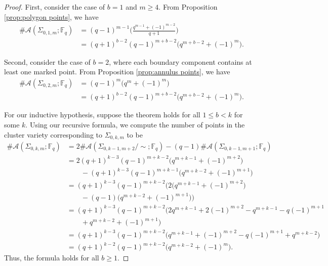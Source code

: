 \documentclass[reqno,12pt]{amsart}
\theoremstyle{definition}
\theoremstyle{remark}
\theoremstyle{remark}
\numberwithin{equation}{section}
\begin{document}
\begin{proof}
    First, consider the case of $b=1$ and $m\geq 4$. From Proposition \ref{prop:polygon points}, we have 
    \begin{align*}
     \#\mathcal{A}(\Sigma_{0,1,m}; \mathbb{F}_q) &= (q-1)^{m-1} \Bigg( \frac{q^{m-1} + (-1)^{m-2}}{q+1} \Bigg) \\
     &= (q+1)^{b-2} (q-1)^{m+b-2} \big( q^{m+b-2} + (-1)^{m}\big).
    \end{align*}
    
    Second, consider the case of $b=2$, where each boundary component contains at least one marked point. From Proposition \ref{prop:annulus points}, we have
    \begin{align*}
     \#\mathcal{A}(\Sigma_{0,2,m}; \mathbb{F}_q) &= (q-1)^{m} \big( q^{m} + (-1)^{m} \big) \\
     &= (q+1)^{b-2} (q-1)^{m+b-2} \big( q^{m+b-2} + (-1)^{m}\big).
    \end{align*}
    
    For our inductive hypothesis, suppose the theorem holds for all $1 \leq b<k$ for some $k$. Using our recursive formula, we compute the number of points in the cluster variety corresponding to $\Sigma_{0,k,m}$ to be 
    \begin{align*}
        \#\mathcal{A}(\Sigma_{0,k,m}; \mathbb{F}_q) &= 2 \#\mathcal{A}(\Sigma_{0,k-1,m+2}/\!\sim; \mathbb{F}_q) - (q-1)\#\mathcal{A}(\Sigma_{0,k-1,m+1}; \mathbb{F}_q) \\
        &= 2(q+1)^{k-3} (q-1)^{m+k-2} \big( q^{m+k-1} + (-1)^{m+2}\big) \\ &\quad\quad - (q+1)^{k-3} (q-1)^{m+k-1} \big( q^{m+k-2} + (-1)^{m+1}\big) \\
        &= (q+1)^{k-3} (q-1)^{m+k-2} \big( 2\big(q^{m+k-1} + (-1)^{m+2}\big) \\ &\quad\quad - (q-1)\big(q^{m+k-2} + (-1)^{m+1}\big)\big) \\
        &= (q+1)^{k-3} (q-1)^{m+k-2} \big( 2q^{m+k-1} + 2(-1)^{m+2} - q^{m+k-1} - q(-1)^{m+1} \\ &\quad\quad + q^{m+k-2} + (-1)^{m+1} \big) \\
        &= (q+1)^{k-3} (q-1)^{m+k-2} \big( q^{m+k-1} + (-1)^{m+2} - q(-1)^{m+1} + q^{m+k-2} \big) \\
        &= (q+1)^{k-2} (q-1)^{m+k-2}\big( q^{m+k-2} + (-1)^{m}\big).
    \end{align*}
    Thus, the formula holds for all $b \geq 1$. 
\end{proof}
\end{document}

